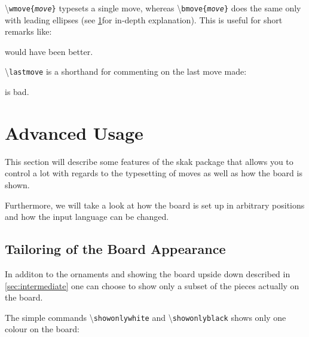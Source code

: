 \documentclass[10pt]{article}
\makeatletter
\renewcommand\showboard{\print@board}
\let\ORIshowboard\showboard
\renewcommand\showboard{%
    \makebox[8\squarelength]{%
    \rule{0pt}{9\squarelength}%
    \begin{postscript}%
    [trim = \squarelength{} 0pt \squarelength{} 0pt]
    \ORIshowboard
    \end{postscript}}}
\newcommand{\package}[1]{\textsf{#1}}
\newcommand{\command}[1]{\textbackslash\texttt{#1}}
\makeatother
\begin{document}
\command{wmove\{\emph{move}\}} typesets a single move, whereas
\command{bmove\{\emph{move}\}} does the same only with leading
ellipses (see \ref{sec:advanced-usage}for in-depth explanation). This
is useful for short remarks like:

\begin{LTXexample}
 would have been better.
\end{LTXexample}


\command{lastmove} is a shorthand for commenting on the last move made:

\begin{LTXexample}
\newgame
{}

\lastmove{} is bad.
\end{LTXexample}

\section{Advanced Usage}
\label{sec:advanced-usage}

This section will describe some features of the \package{skak} package
that allows you to control a lot with regards to the typesetting of
moves as well as how the board is shown.

Furthermore, we will take a look at how the board is set up in
arbitrary positions and how the input language can be changed.


\subsection{Tailoring of the Board Appearance}
\label{sec:tail-board-appe}

In additon to the ornaments and showing the board upside down
described in \ref{sec:intermediate} one can choose to show only a
subset of the pieces actually on the board.

The simple commands \command{showonlywhite} and \command{showonlyblack} shows
only one colour on the board:

\begin{LTXexample}
\newgame
{}

\showonlywhite
\showboard

\end{LTXexample}

\begin{LTXexample}
\showonlyblack
\showboard
\end{LTXexample}
\end{document}
